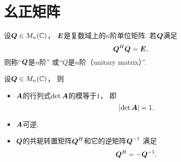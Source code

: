 \section{幺正矩阵}
\begin{definition}\label{definition:幺正矩阵.幺正矩阵的定义}
设\(\boldsymbol{Q} \in M_n(\mathbb{C})\)，
\(\boldsymbol{E}\)是复数域上的\(n\)阶单位矩阵.
若\(\boldsymbol{Q}\)满足\begin{equation}\label{equation:幺正矩阵.幺正矩阵的定义式}
	\boldsymbol{Q}^H \boldsymbol{Q} = \boldsymbol{E},
\end{equation}
则称“\(\boldsymbol{Q}\)是\(n\)阶”
或“\(Q\)是\(n\)阶（unitary matrix）”.
\end{definition}

\begin{property}
设\(\boldsymbol{Q} \in M_n(\mathbb{C})\)，
则\begin{itemize}
	\item \(\boldsymbol{A}\)的行列式\(\det\boldsymbol{A}\)的模等于\(1\)，
	即\begin{equation}\label{equation:幺正矩阵.幺正矩阵的行列式}
		\abs{\det\boldsymbol{A}}=1.
	\end{equation}

	\item \(\boldsymbol{A}\)可逆.

	\item \(\boldsymbol{Q}\)的共轭转置矩阵\(\boldsymbol{Q}^H\)和它的逆矩阵\(\boldsymbol{Q}^{-1}\)
	满足\begin{equation}\label{equation:幺正矩阵.幺正矩阵的转置等于幺正矩阵的逆}
		\boldsymbol{Q}^H = -\boldsymbol{Q}^{-1}.
	\end{equation}
\end{itemize}
\end{property}


